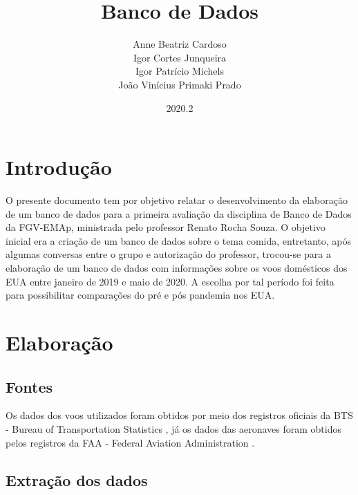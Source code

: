 \documentclass{article}
\title{Banco de Dados}
\author{Anne Beatriz Cardoso \\ Igor Cortes Junqueira \\ Igor Patrício Michels \\ João Vinícius Primaki Prado}
\date{2020.2}
\begin{document}
\maketitle

\section{Introdução}

O presente documento tem por objetivo relatar o desenvolvimento da elaboração de um banco de dados para a primeira avaliação da disciplina de Banco de Dados da FGV-EMAp, ministrada pelo professor Renato Rocha Souza. O objetivo inicial era a criação de um banco de dados sobre o tema comida, entretanto, após algumas conversas entre o grupo e autorização do professor, trocou-se para a elaboração de um banco de dados com informações sobre os voos domésticos dos EUA entre janeiro de 2019 e maio de 2020. A escolha por tal período foi feita para possibilitar comparações do pré e pós pandemia nos EUA.

\section{Elaboração}

\subsection{Fontes}

Os dados dos voos utilizados foram obtidos por meio dos registros oficiais da BTS - Bureau of Transportation Statistics \cite{BTS}, já os dados das aeronaves foram obtidos pelos registros da FAA - Federal Aviation Administration \cite{FAA}.

\subsection{Extração dos dados}
\end{document}
